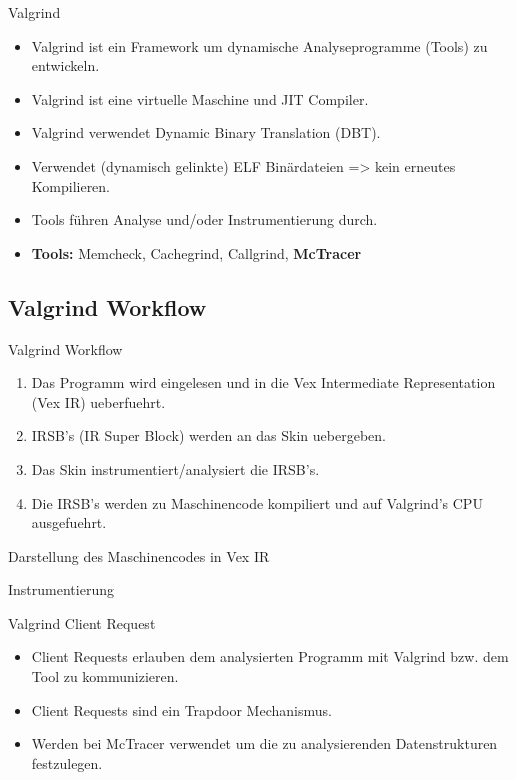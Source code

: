 \begin{frame}{Valgrind}
	\begin{itemize}
		\item Valgrind ist ein Framework um dynamische Analyseprogramme (Tools) zu entwickeln.
		\pause \item Valgrind ist eine virtuelle Maschine und JIT Compiler.
		\pause \item Valgrind verwendet Dynamic Binary Translation (DBT).
        \pause \item Verwendet (dynamisch gelinkte) ELF Binärdateien => kein erneutes Kompilieren.
		\pause \item Tools führen Analyse und/oder Instrumentierung durch.
		\pause \item{\bf Tools:} Memcheck, Cachegrind, Callgrind, {\bf McTracer} 
	\end{itemize}
\end{frame}

\subsection{Valgrind Workflow}

\begin{frame}{Valgrind Workflow}
	\begin{enumerate}
		\item Das Programm wird eingelesen und in die Vex Intermediate Representation (Vex IR) ueberfuehrt.
		\pause \item IRSB's (IR Super Block) werden an das Skin uebergeben. 
		\pause \item Das Skin instrumentiert/analysiert die IRSB's.
		\pause \item Die IRSB's werden zu Maschinencode kompiliert und auf Valgrind's CPU ausgefuehrt. 
	\end{enumerate}
\end{frame}

\begin{frame}{Darstellung des Maschinencodes in Vex IR}
	\lstset{frame=single}
	
\end{frame}

\begin{frame}{Instrumentierung}
	\lstset{frame=single}
		
\end{frame}

\begin{frame}{Valgrind Client Request}
	\begin{itemize}
		\item Client Requests erlauben dem analysierten Programm mit Valgrind bzw. dem Tool zu kommunizieren.
		\pause \item Client Requests sind ein Trapdoor Mechanismus.
		\pause \item Werden bei McTracer verwendet um die zu analysierenden Datenstrukturen festzulegen.
	\end{itemize}

	\pause

	\lstset{frame=single}
		
\end{frame}
